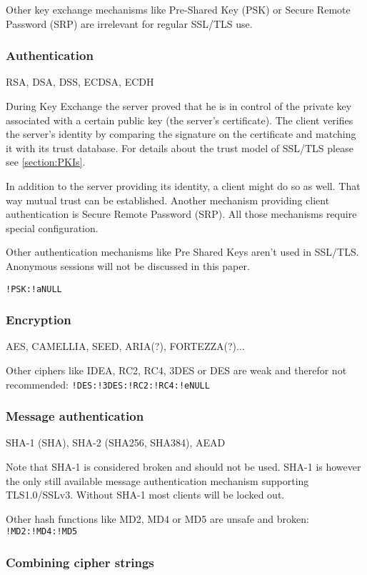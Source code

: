 Other key exchange mechanisms like Pre-Shared Key (PSK) or Secure Remote Password
(SRP) are irrelevant for regular SSL/TLS use.

\subsubsection{Authentication}

RSA, DSA, DSS, ECDSA, ECDH

During Key Exchange the server proved that he is in control of the private key
associated with a certain public key (the server's certificate). The client
verifies the server's identity by comparing the signature on the certificate
and matching it with its trust database. For details about the trust model of
SSL/TLS please see \ref{section:PKIs}.

In addition to the server providing its identity, a client might do so as well.
That way mutual trust can be established. Another mechanism providing client
authentication is Secure Remote Password (SRP). All those
mechanisms require special configuration.

Other authentication mechanisms like Pre Shared Keys aren't used in SSL/TLS.
Anonymous sessions will not be discussed in this paper.

\texttt{!PSK:!aNULL}

\subsubsection{Encryption}

AES, CAMELLIA, SEED, ARIA(?), FORTEZZA(?)...

Other ciphers like IDEA, RC2, RC4, 3DES or DES are weak and therefor not recommended:
\texttt{!DES:!3DES:!RC2:!RC4:!eNULL}

\subsubsection{Message authentication}

SHA-1 (SHA), SHA-2 (SHA256, SHA384), AEAD

Note that SHA-1 is considered broken and should not be used. SHA-1 is however the
only still available message authentication mechanism supporting TLS1.0/SSLv3. Without
SHA-1 most clients will be locked out.

Other hash functions like MD2, MD4 or MD5 are unsafe and broken: \texttt{!MD2:!MD4:!MD5}

\subsubsection{Combining cipher strings}

